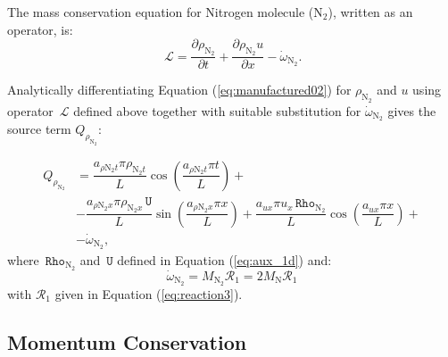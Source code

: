 \documentclass[10pt]{article}
\newcommand{\diff}[2] {\dfrac{\partial #1 }{\partial #2}}
\newcommand{\Lo}{\,\mathcal{L}}
\newcommand{\Rho}{\,\mathtt{Rho}}
\newcommand{\U}{\,\mathtt{U}}
\newcommand{\N}{\text{N}}
\begin{document}
The mass conservation equation for Nitrogen molecule ($\text{N}_2$), written as an operator, is:
\begin{equation*}
 \label{eq:euler1d_11a}
\Lo =  \diff{\rho_{\text{N}_2}}{t}+\diff{\rho_{\text{N}_2} u }{x} - \dot{\omega}_{\text{N}_2}.
\end{equation*}

Analytically differentiating Equation (\ref{eq:manufactured02}) for $\rho_{\text{N}_2}$ and $u$ using operator $\Lo$ defined above together with suitable substitution for $\dot{\omega}_{\text{N}_2}$ gives the source term $Q_{\rho_{\text{N}_2}}$:

\begin{equation*}
\begin{split}
Q_{\rho_{\N_2}} &=  \dfrac{a_{\rho \N_2 t} \pi \rho_{\N_2 t} }{L} \cos\left(\dfrac{a_{\rho \N_2 t} \pi t}{L}\right)+ \\
& -\dfrac{a_{  \rho \N_2 x } \pi \rho_{\N_2 x} \U }{L}\sin\left(\dfrac{a_{  \rho \N_2 x } \pi x}{L}\right) +\dfrac{a_{ux} \pi u_x \Rho_{\N_2}}{L} \cos\left(\dfrac{a_{ux} \pi x}{L}\right)+\\&
 -\dot{\omega}_{\N_2},
\end{split}
\end{equation*}
where $\Rho_{\N_2}$ and $\U$ defined in Equation (\ref{eq:aux_1d}) and:
$$
\dot{\omega}_{\N_2} =  M_{\N_2} \mathcal{R}_1	= 2 M_\N \mathcal{R}_1	
$$
with  $\mathcal{R}_1$ given in Equation (\ref{eq:reaction3}).


\subsection{Momentum Conservation}
\end{document}
